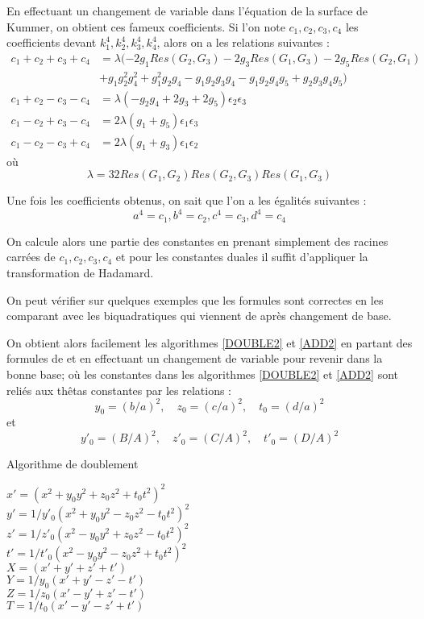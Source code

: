 \documentclass[a4paper]{article}
\theoremstyle{definition}
\theoremstyle{remark}
\numberwithin{equation}{section}
\begin{document}
En effectuant un changement de variable dans l'équation de la surface de Kummer, on obtient ces fameux coefficients. Si l'on note $c_1,c_2,c_3,c_4$ les coefficients devant $k_1^4,k_2^4,k_3^4,k_4^4$, alors on a les relations suivantes :
\begin{align*}
c_1+c_2+c_3+c_4 &= \lambda(-2g_1Res(G_2,G_3)-2g_3Res(G_1,G_3)-2g_5Res(G_2,G_1) \\
 &+ g_1g_2^2g_4^2 + g_1^2g_2g_4 - g_1g_2g_3g_4 - g_1g_2g_4g_5 + g_2g_3g_4g_5) \\
c_1+c_2-c_3-c_4 &= \lambda(-g_2g_4+2g_3+2g_5)\epsilon_2\epsilon_3 \\
c_1-c_2+c_3-c_4 &= 2\lambda(g_1+g_5)\epsilon_1\epsilon_3 \\
c_1-c_2-c_3+c_4 &= 2\lambda(g_1+g_3)\epsilon_1\epsilon_2
\end{align*}
où
$$\lambda = 32Res(G_1,G_2)Res(G_2,G_3)Res(G_1,G_3)$$

Une fois les coefficients obtenus, on sait que l'on a les égalités suivantes :
$$a^4 = c_1, b^4 = c_2, c^4 = c_3 , d^4 = c_4$$

On calcule alors une partie des constantes en prenant simplement des racines carrées de $c_1,c_2,c_3,c_4$ et pour les constantes duales il suffit d'appliquer la transformation de Hadamard.

On peut vérifier sur quelques exemples que les formules sont correctes en les comparant avec les biquadratiques qui viennent de \citep{cassels-Flynn} après changement de base.

On obtient alors facilement les algorithmes \ref{DOUBLE2} et \ref{ADD2} en partant des formules de \citep{gaudry} et en effectuant un changement de variable pour revenir dans la bonne base; où les constantes dans les algorithmes \ref{DOUBLE2} et \ref{ADD2} sont reliés aux thêtas constantes par les relations :
$$y_0 = (b/a)^2, \quad z_0 = (c/a)^2, \quad t_0 = (d/a)^2$$
et
$$y'_0 = (B/A)^2, \quad z'_0 = (C/A)^2, \quad t'_0 = (D/A)^2$$

\begin{algorithm}
\label{DOUBLE2}
\caption{Algorithme de doublement}
$x' = (x^2 + y_0y^2 + z_0z^2 + t_0t^2)^2$ \\
$y' = 1/y'_0(x^2 + y_0y^2 - z_0z^2 - t_0t^2)^2$ \\
$z' = 1/z'_0(x^2 - y_0y^2 + z_0z^2 - t_0t^2)^2$ \\
$t' = 1/t'_0(x^2 - y_0y^2 - z_0z^2 + t_0t^2)^2$ \\
$X = (x' + y' + z' + t')$ \\
$Y = 1/y_0(x' + y' - z' - t')$ \\
$Z = 1/z_0(x' - y' + z' - t')$ \\
$T = 1/t_0(x' - y' - z' + t')$ \\
\end{algorithm}
\end{document}
